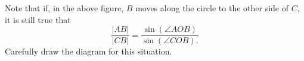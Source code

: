\documentclass{ximera}
\begin{document}
\begin{problem}
Note that if, in the above figure, $B$ moves along the
circle to the other side of $C$, it is still true that%
\[
\frac{\left\vert AB\right\vert }{\left\vert CB\right\vert }=\frac
{\sin\left(  \angle AOB\right)  }{\sin\left(  \angle
COB\right).  }%
\]
Carefully draw the diagram for this situation.
\end{problem}
\end{document}
